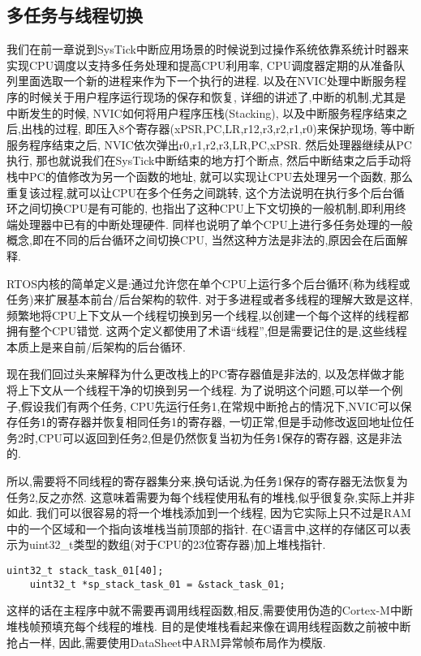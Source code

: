 \subsection{多任务与线程切换}
我们在前一章说到SysTick中断应用场景的时候说到过操作系统依靠系统计时器来实现CPU调度以支持多任务处理和提高CPU利用率,
CPU调度器定期的从准备队列里面选取一个新的进程来作为下一个执行的进程.
以及在NVIC处理中断服务程序的时候关于用户程序运行现场的保存和恢复,
详细的讲述了,中断的机制,尤其是中断发生的时候,
NVIC如何将用户程序压栈(Stacking),
以及中断服务程序结束之后,出栈的过程,
即压入8个寄存器(xPSR,PC,LR,r12,r3,r2,r1,r0)来保护现场,
等中断服务程序结束之后,
NVIC依次弹出r0,r1,r2,r3,LR,PC,xPSR.
然后处理器继续从PC执行,
那也就说我们在SysTick中断结束的地方打个断点,
然后中断结束之后手动将栈中PC的值修改为另一个函数的地址,
就可以实现让CPU去处理另一个函数,
那么重复该过程,就可以让CPU在多个任务之间跳转,
这个方法说明在执行多个后台循环之间切换CPU是有可能的,
也指出了这种CPU上下文切换的一般机制,即利用终端处理器中已有的中断处理硬件.
同样也说明了单个CPU上进行多任务处理的一般概念,即在不同的后台循环之间切换CPU,
当然这种方法是非法的,原因会在后面解释.

RTOS内核的简单定义是:通过允许您在单个CPU上运行多个后台循环(称为线程或任务)来扩展基本前台/后台架构的软件.
对于多进程或者多线程的理解大致是这样,
频繁地将CPU上下文从一个线程切换到另一个线程,以创建一个每个这样的线程都拥有整个CPU错觉.
这两个定义都使用了术语“线程”,但是需要记住的是,这些线程本质上是来自前/后架构的后台循环.

现在我们回过头来解释为什么更改栈上的PC寄存器值是非法的,
以及怎样做才能将上下文从一个线程干净的切换到另一个线程.
为了说明这个问题,可以举一个例子,假设我们有两个任务,
CPU先运行任务1,在常规中断抢占的情况下,NVIC可以保存任务1的寄存器并恢复相同任务1的寄存器,
一切正常,但是手动修改返回地址位任务2时,CPU可以返回到任务2,但是仍然恢复当初为任务1保存的寄存器,
这是非法的.

所以,需要将不同线程的寄存器集分来,换句话说,为任务1保存的寄存器无法恢复为任务2,反之亦然.
这意味着需要为每个线程使用私有的堆栈,似乎很复杂,实际上并非如此.
我们可以很容易的将一个堆栈添加到一个线程,
因为它实际上只不过是RAM中的一个区域和一个指向该堆栈当前顶部的指针.
在C语言中,这样的存储区可以表示为uint32\_t类型的数组(对于CPU的23位寄存器)加上堆栈指针.
\begin{lstlisting}[language={[ANSI]C},keywordstyle=\color{blue!70},commentstyle=\color{red!50!green!50!blue!50},frame=shadowbox, rulesepcolor=\color{red!20!green!20!blue!20}]
    uint32_t stack_task_01[40];
    uint32_t *sp_stack_task_01 = &stack_task_01;
\end{lstlisting}
这样的话在主程序中就不需要再调用线程函数,相反,需要使用伪造的Cortex-M中断堆栈帧预填充每个线程的堆栈.
目的是使堆栈看起来像在调用线程函数之前被中断抢占一样,
因此,需要使用DataSheet中ARM异常帧布局作为模版.

